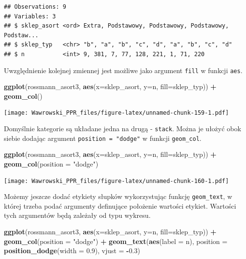 \documentclass[]{book}
\newenvironment{Shaded}{\begin{snugshade}}{\end{snugshade}}
\newcommand{\KeywordTok}[1]{\textcolor[rgb]{0.13,0.29,0.53}{\textbf{#1}}}
\newcommand{\DataTypeTok}[1]{\textcolor[rgb]{0.13,0.29,0.53}{#1}}
\newcommand{\FloatTok}[1]{\textcolor[rgb]{0.00,0.00,0.81}{#1}}
\newcommand{\StringTok}[1]{\textcolor[rgb]{0.31,0.60,0.02}{#1}}
\newcommand{\OperatorTok}[1]{\textcolor[rgb]{0.81,0.36,0.00}{\textbf{#1}}}
\newcommand{\NormalTok}[1]{#1}
\begin{document}
\begin{verbatim}
## Observations: 9
## Variables: 3
## $ sklep_asort <ord> Extra, Podstawowy, Podstawowy, Podstawowy, Podstaw...
## $ sklep_typ   <chr> "b", "a", "b", "c", "d", "a", "b", "c", "d"
## $ n           <int> 9, 381, 7, 77, 128, 221, 1, 71, 220
\end{verbatim}

Uwzględnienie kolejnej zmiennej jest możliwe jako argument \texttt{fill}
w funkcji \texttt{aes}.

\begin{Shaded}
\begin{Highlighting}[]
\KeywordTok{ggplot}\NormalTok{(rossmann_asort3, }\KeywordTok{aes}\NormalTok{(}\DataTypeTok{x=}\NormalTok{sklep_asort, }\DataTypeTok{y=}\NormalTok{n, }\DataTypeTok{fill=}\NormalTok{sklep_typ)) }\OperatorTok{+}
\StringTok{  }\KeywordTok{geom_col}\NormalTok{()}
\end{Highlighting}
\end{Shaded}

\texttt{[image: Wawrowski\_PPR\_files/figure-latex/unnamed-chunk-159-1.pdf]}

Domyślnie kategorie są układane jedna na drugą - \texttt{stack}. Można
je ułożyć obok siebie dodając argument \texttt{position\ =\ "dodge"} w
funkcji \texttt{geom\_col}.

\begin{Shaded}
\begin{Highlighting}[]
\KeywordTok{ggplot}\NormalTok{(rossmann_asort3, }\KeywordTok{aes}\NormalTok{(}\DataTypeTok{x=}\NormalTok{sklep_asort, }\DataTypeTok{y=}\NormalTok{n, }\DataTypeTok{fill=}\NormalTok{sklep_typ)) }\OperatorTok{+}
\StringTok{  }\KeywordTok{geom_col}\NormalTok{(}\DataTypeTok{position =} \StringTok{"dodge"}\NormalTok{)}
\end{Highlighting}
\end{Shaded}

\texttt{[image: Wawrowski\_PPR\_files/figure-latex/unnamed-chunk-160-1.pdf]}

Możemy jeszcze dodać etykiety słupków wykorzystując funkcję
\texttt{geom\_text}, w której trzeba podać argumenty definujące
położenie wartości etykiet. Wartości tych argumentów będą zależały od
typu wykresu.

\begin{Shaded}
\begin{Highlighting}[]
\KeywordTok{ggplot}\NormalTok{(rossmann_asort3, }\KeywordTok{aes}\NormalTok{(}\DataTypeTok{x=}\NormalTok{sklep_asort, }\DataTypeTok{y=}\NormalTok{n, }\DataTypeTok{fill=}\NormalTok{sklep_typ)) }\OperatorTok{+}
\StringTok{  }\KeywordTok{geom_col}\NormalTok{(}\DataTypeTok{position =} \StringTok{"dodge"}\NormalTok{) }\OperatorTok{+}\StringTok{ }
\StringTok{  }\KeywordTok{geom_text}\NormalTok{(}\KeywordTok{aes}\NormalTok{(}\DataTypeTok{label =}\NormalTok{ n), }
            \DataTypeTok{position =} \KeywordTok{position_dodge}\NormalTok{(}\DataTypeTok{width =} \FloatTok{0.9}\NormalTok{),}
            \DataTypeTok{vjust =} \OperatorTok{-}\FloatTok{0.3}\NormalTok{)}
\end{Highlighting}
\end{Shaded}
\end{document}
